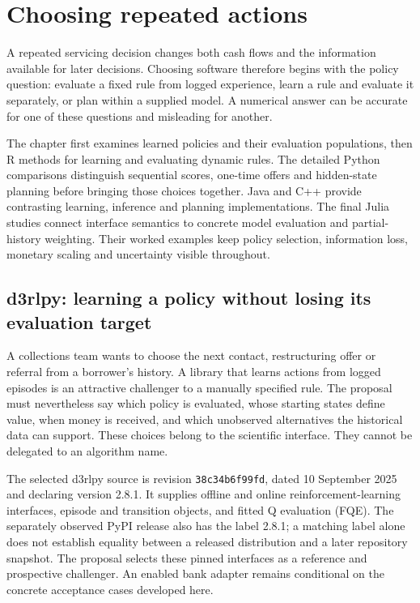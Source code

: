\chapter{Choosing repeated actions}




A repeated servicing decision changes both cash flows and the information
available for later decisions. Choosing software therefore begins with the
policy question: evaluate a fixed rule from logged experience, learn a rule
and evaluate it separately, or plan within a supplied model. A numerical
answer can be accurate for one of these questions and misleading for another.

The chapter first examines learned policies and their evaluation populations,
then R methods for learning and evaluating dynamic rules. The detailed Python
comparisons distinguish sequential scores, one-time offers and hidden-state
planning before bringing those choices together. Java and C++ provide
contrasting learning, inference and planning implementations. The final Julia
studies connect interface semantics to concrete model evaluation and
partial-history weighting. Their worked examples keep policy selection,
information loss, monetary scaling and uncertainty visible throughout.

\section{d3rlpy: learning a policy without losing its evaluation target}
\label{exec15:d3rlpy-contract}

A collections team wants to choose the next contact, restructuring offer or
referral from a borrower's history. A library that learns actions from logged
episodes is an attractive challenger to a manually specified rule. The
proposal must nevertheless say which policy is evaluated, whose starting
states define value, when money is received, and which unobserved alternatives
the historical data can support. These choices belong to the scientific
interface. They cannot be delegated to an algorithm name.

The selected d3rlpy source is revision \texttt{38c34b6f99fd}, dated
10 September 2025 and declaring version 2.8.1. It supplies offline and online
reinforcement-learning interfaces, episode and transition objects, and fitted
Q evaluation (FQE). The separately observed PyPI release also has the label
2.8.1; a matching label alone does not establish equality between a released
distribution and a later repository snapshot. The proposal selects these
pinned interfaces as a reference and prospective challenger. An enabled bank
adapter remains conditional on the concrete acceptance cases developed here.
\citep{exec15_d3rlpy_package,exec15_d3rlpy_value,exec15_d3rlpy_contract}

